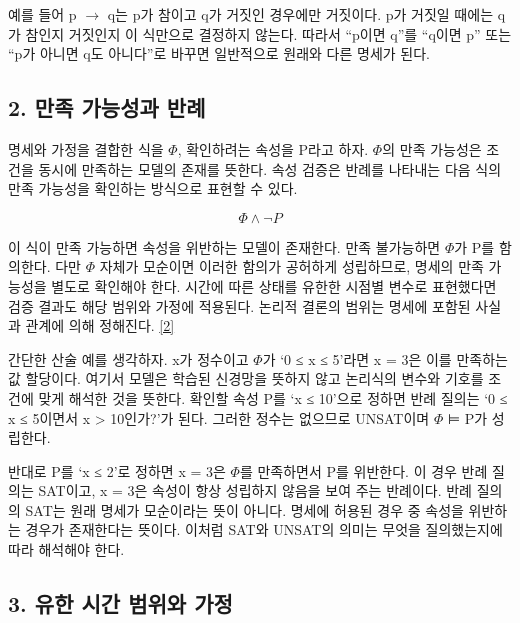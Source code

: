 \documentclass[11pt,a4paper]{article}
\begin{document}
예를 들어 p \ensuremath{\rightarrow} q는 p가 참이고 q가 거짓인 경우에만 거짓이다. p가 거짓일 때에는 q가 참인지 거짓인지 이 식만으로 결정하지 않는다. 따라서 “p이면 q”를 “q이면 p” 또는 “p가 아니면 q도 아니다”로 바꾸면 일반적으로 원래와 다른 명세가 된다.\par

\subsection*{2. 만족 가능성과 반례}

명세와 가정을 결합한 식을 \ensuremath{\Phi}, 확인하려는 속성을 P라고 하자. \ensuremath{\Phi}의 만족 가능성은 조건을 동시에 만족하는 모델의 존재를 뜻한다. 속성 검증은 반례를 나타내는 다음 식의 만족 가능성을 확인하는 방식으로 표현할 수 있다.\par

\[\Phi \land \neg P\]

이 식이 만족 가능하면 속성을 위반하는 모델이 존재한다. 만족 불가능하면 \ensuremath{\Phi}가 P를 함의한다. 다만 \ensuremath{\Phi} 자체가 모순이면 이러한 함의가 공허하게 성립하므로, 명세의 만족 가능성을 별도로 확인해야 한다. 시간에 따른 상태를 유한한 시점별 변수로 표현했다면 검증 결과도 해당 범위와 가정에 적용된다. 논리적 결론의 범위는 명세에 포함된 사실과 관계에 의해 정해진다. \href{\detokenize{https://theory.stanford.edu/~barrett/pubs/BT18.pdf}}{[2]}\par

간단한 산술 예를 생각하자. x가 정수이고 \ensuremath{\Phi}가 ‘0 ≤ x ≤ 5’라면 x = 3은 이를 만족하는 값 할당이다. 여기서 모델은 학습된 신경망을 뜻하지 않고 논리식의 변수와 기호를 조건에 맞게 해석한 것을 뜻한다. 확인할 속성 P를 ‘x ≤ 10’으로 정하면 반례 질의는 ‘0 ≤ x ≤ 5이면서 x > 10인가?’가 된다. 그러한 정수는 없으므로 UNSAT이며 \ensuremath{\Phi} ⊨ P가 성립한다.\par

반대로 P를 ‘x ≤ 2’로 정하면 x = 3은 \ensuremath{\Phi}를 만족하면서 P를 위반한다. 이 경우 반례 질의는 SAT이고, x = 3은 속성이 항상 성립하지 않음을 보여 주는 반례이다. 반례 질의의 SAT는 원래 명세가 모순이라는 뜻이 아니다. 명세에 허용된 경우 중 속성을 위반하는 경우가 존재한다는 뜻이다. 이처럼 SAT와 UNSAT의 의미는 무엇을 질의했는지에 따라 해석해야 한다.\par

\subsection*{3. 유한 시간 범위와 가정}
\end{document}
